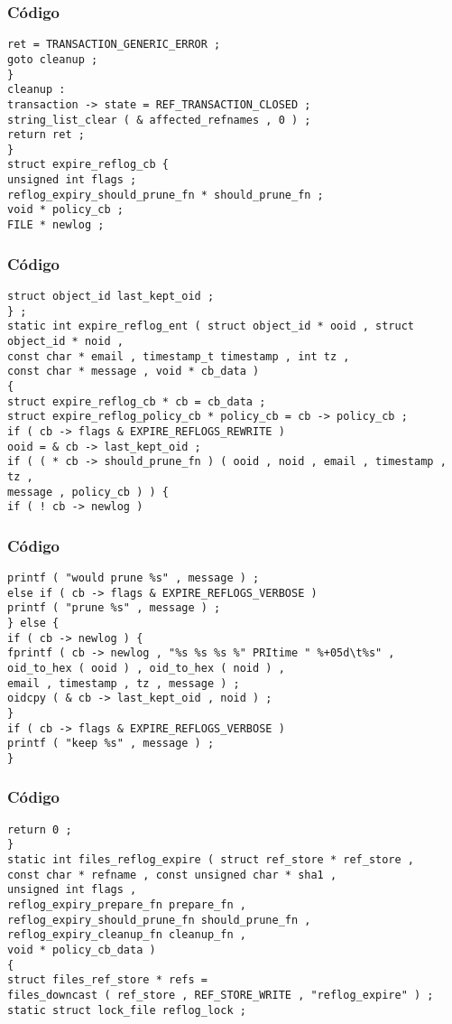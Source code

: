 \documentclass{beamer}
\begin{document}
\begin{frame}[fragile]
\frametitle{C\'odigo}
\begin{verbatim}
ret = TRANSACTION_GENERIC_ERROR ; 
goto cleanup ; 
} 
cleanup : 
transaction -> state = REF_TRANSACTION_CLOSED ; 
string_list_clear ( & affected_refnames , 0 ) ; 
return ret ; 
} 
struct expire_reflog_cb { 
unsigned int flags ; 
reflog_expiry_should_prune_fn * should_prune_fn ; 
void * policy_cb ; 
FILE * newlog ; 
\end{verbatim}
\end{frame}
\begin{frame}[fragile]
\frametitle{C\'odigo}
\begin{verbatim}
struct object_id last_kept_oid ; 
} ; 
static int expire_reflog_ent ( struct object_id * ooid , struct object_id * noid , 
const char * email , timestamp_t timestamp , int tz , 
const char * message , void * cb_data ) 
{ 
struct expire_reflog_cb * cb = cb_data ; 
struct expire_reflog_policy_cb * policy_cb = cb -> policy_cb ; 
if ( cb -> flags & EXPIRE_REFLOGS_REWRITE ) 
ooid = & cb -> last_kept_oid ; 
if ( ( * cb -> should_prune_fn ) ( ooid , noid , email , timestamp , tz , 
message , policy_cb ) ) { 
if ( ! cb -> newlog ) 
\end{verbatim}
\end{frame}
\begin{frame}[fragile]
\frametitle{C\'odigo}
\begin{verbatim}
printf ( "would prune %s" , message ) ; 
else if ( cb -> flags & EXPIRE_REFLOGS_VERBOSE ) 
printf ( "prune %s" , message ) ; 
} else { 
if ( cb -> newlog ) { 
fprintf ( cb -> newlog , "%s %s %s %" PRItime " %+05d\t%s" , 
oid_to_hex ( ooid ) , oid_to_hex ( noid ) , 
email , timestamp , tz , message ) ; 
oidcpy ( & cb -> last_kept_oid , noid ) ; 
} 
if ( cb -> flags & EXPIRE_REFLOGS_VERBOSE ) 
printf ( "keep %s" , message ) ; 
} 
\end{verbatim}
\end{frame}
\begin{frame}[fragile]
\frametitle{C\'odigo}
\begin{verbatim}
return 0 ; 
} 
static int files_reflog_expire ( struct ref_store * ref_store , 
const char * refname , const unsigned char * sha1 , 
unsigned int flags , 
reflog_expiry_prepare_fn prepare_fn , 
reflog_expiry_should_prune_fn should_prune_fn , 
reflog_expiry_cleanup_fn cleanup_fn , 
void * policy_cb_data ) 
{ 
struct files_ref_store * refs = 
files_downcast ( ref_store , REF_STORE_WRITE , "reflog_expire" ) ; 
static struct lock_file reflog_lock ; 
\end{verbatim}
\end{frame}
\end{document}
